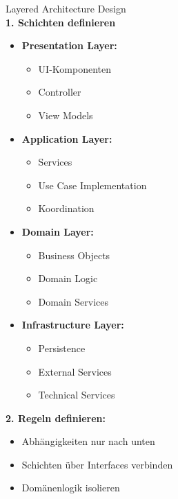 \begin{KR}{Layered Architecture Design}\\
    \small
\textbf{1. Schichten definieren}
\begin{itemize}
    \item \textbf{Presentation Layer:}
    \begin{itemize}
        \item UI-Komponenten
        \item Controller
        \item View Models
    \end{itemize}
    
    \item \textbf{Application Layer:}
    \begin{itemize}
        \item Services
        \item Use Case Implementation
        \item Koordination
    \end{itemize}
    
    \item \textbf{Domain Layer:}
    \begin{itemize}
        \item Business Objects
        \item Domain Logic
        \item Domain Services
    \end{itemize}
    
    \item \textbf{Infrastructure Layer:}
    \begin{itemize}
        \item Persistence
        \item External Services
        \item Technical Services
    \end{itemize}
\end{itemize}

\textbf{2. Regeln definieren:}
\begin{itemize}
    \item Abhängigkeiten nur nach unten
    \item Schichten über Interfaces verbinden
    \item Domänenlogik isolieren
\end{itemize}
\end{KR}

